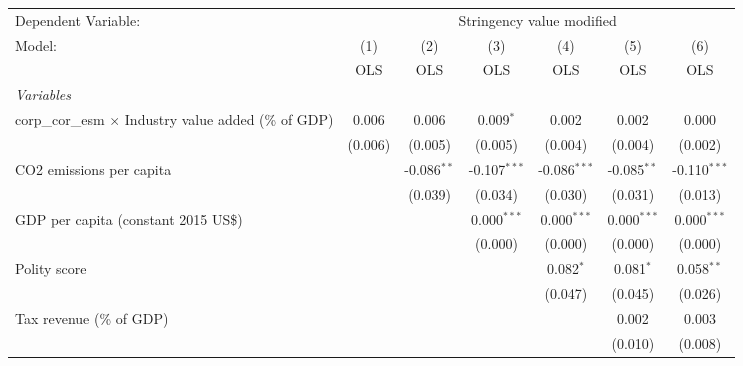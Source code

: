 
\begingroup
\centering
\begin{tabular}{lcccccc}
   \toprule
   Dependent Variable: & \multicolumn{6}{c}{Stringency value modified}\\
   Model:                                                       & (1)     & (2)           & (3)            & (4)            & (5)           & (6)\\  
                                                                &  OLS    & OLS           & OLS            & OLS            & OLS           & OLS\\  
   \midrule
   \emph{Variables}\\
   corp\_cor\_esm $\times$ Industry value added (\% of GDP)     & 0.006   & 0.006         & 0.009$^{*}$    & 0.002          & 0.002         & 0.000\\   
                                                                & (0.006) & (0.005)       & (0.005)        & (0.004)        & (0.004)       & (0.002)\\   
   CO2 emissions per capita                                     &         & -0.086$^{**}$ & -0.107$^{***}$ & -0.086$^{***}$ & -0.085$^{**}$ & -0.110$^{***}$\\   
                                                                &         & (0.039)       & (0.034)        & (0.030)        & (0.031)       & (0.013)\\   
   GDP per capita (constant 2015 US\$)                          &         &               & 0.000$^{***}$  & 0.000$^{***}$  & 0.000$^{***}$ & 0.000$^{***}$\\   
                                                                &         &               & (0.000)        & (0.000)        & (0.000)       & (0.000)\\   
   Polity score                                                 &         &               &                & 0.082$^{*}$    & 0.081$^{*}$   & 0.058$^{**}$\\   
                                                                &         &               &                & (0.047)        & (0.045)       & (0.026)\\   
   Tax revenue (\% of GDP)                                      &         &               &                &                & 0.002         & 0.003\\   
                                                                &         &               &                &                & (0.010)       & (0.008)\\   

\end{tabular}
